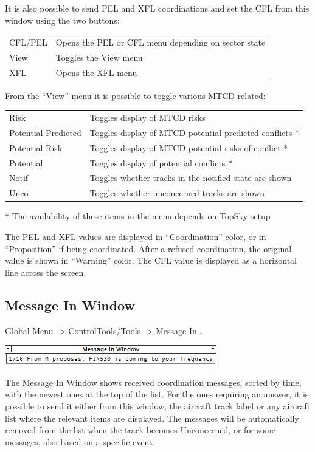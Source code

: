 \documentclass[11pt,a4paper,oldfontcommands]{memoir}
\begin{document}
It is also possible to send PEL and XFL coordinations and set the CFL from this window using the two buttons:

\begin{tabular}{l l}
    CFL/PEL     & Opens the PEL or CFL menu depending on sector state\\
    View        & Toggles the View menu\\
    XFL         & Opens the XFL menu\\
\end{tabular}

From the “View” menu it is possible to toggle various MTCD related:

\begin{tabular}{l l}
    Risk                    & Toggles display of MTCD risks\\
    Potential Predicted     & Toggles display of MTCD potential predicted conflicts *\\
    Potential Risk          & Toggles display of MTCD potential risks of conflict *\\
    Potential               & Toggles display of potential conflicts *\\
    Notif                   & Toggles whether tracks in the notified state are shown\\
    Unco                    & Toggles whether unconcerned tracks are shown\\
\end{tabular}

* The availability of these items in the menu depends on TopSky setup

The PEL and XFL values are displayed in “Coordination” color, or in “Proposition” if being coordinated. After a refused coordination, the original value is shown in “Warning” color. The CFL value is displayed as a horizontal line across the screen.

\subsection{Message In Window}
\label{win:miw}

Global Menu -> ControlTools/Tools -> Message In...

\includegraphics{img/miw.png}

The Message In Window shows received coordination messages, sorted by time, with the newest ones at the top of the list. For the ones requiring an answer, it is possible to send it either from this window, the aircraft track label or any aircraft list where the relevant items are displayed. The messages will be automatically removed from the list when the track becomes Unconcerned, or for some messages, also based on a specific event.
\end{document}
